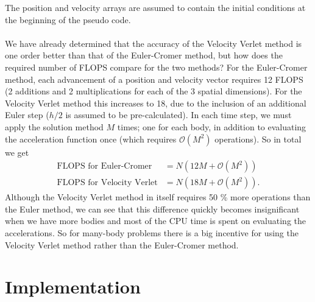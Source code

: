 \documentclass{article}
\newcommand{\lrp}[1]{\left(#1\right)}
\begin{document}
\noindent The position and velocity arrays are assumed to contain the initial conditions at the beginning of the pseudo code. \\\\
We have already determined that the accuracy of the Velocity Verlet method is one order better than that of the Euler-Cromer method, but how does the required number of FLOPS compare for the two methods? For the Euler-Cromer method, each advancement of a position and velocity vector requires 12 FLOPS (2 additions and 2 multiplications for each of the 3 spatial dimensions). For the Velocity Verlet method this increases to 18, due to the inclusion of an additional Euler step ($h/2$ is assumed to be pre-calculated). In each time step, we must apply the solution method $M$ times; one for each body, in addition to evaluating the acceleration function once (which requires $\mathcal{O}(M^2)$ operations). So in total we get
\begin{align*}
    \text{FLOPS for Euler-Cromer} &= N\lrp{12M + \mathcal{O}(M^2)} \\
    \text{FLOPS for Velocity Verlet} &= N\lrp{18M + \mathcal{O}(M^2)}.
\end{align*}
Although the Velocity Verlet method in itself requires 50 \% more operations than the Euler method, we can see that this difference quickly becomes insignificant when we have more bodies and most of the CPU time is spent on evaluating the accelerations. So for many-body problems there is a big incentive for using the Velocity Verlet method rather than the Euler-Cromer method.

\section{Implementation} \label{section:imp}
\end{document}
